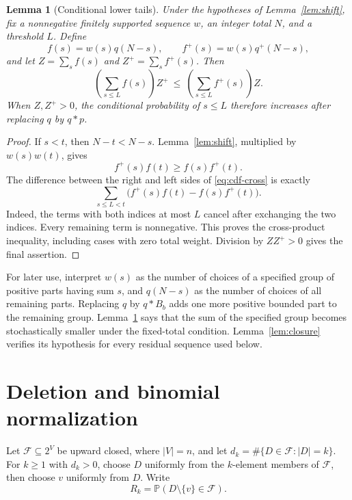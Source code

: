 \documentclass[11pt]{article}
\newtheorem{lemma}[theorem]{Lemma}
\theoremstyle{definition}
\theoremstyle{remark}
\newcommand{\Prob}{\mathbb{P}}
\begin{document}
\begin{lemma}[Conditional lower tails]\label{lem:conditional}
Under the hypotheses of Lemma~\ref{lem:shift}, fix a nonnegative finitely
supported sequence $w$, an integer total $N$, and a threshold $L$.
Define
\[
 f(s)=w(s)q(N-s),\qquad f^+(s)=w(s)q^+(N-s),
\]
and let $Z=\sum_s f(s)$ and $Z^+=\sum_s f^+(s)$. Then
\begin{equation}\label{eq:cdf-cross}
 \left(\sum_{s\leq L}f(s)\right)Z^+
 \ \leq\ \left(\sum_{s\leq L}f^+(s)\right)Z.
\end{equation}
When $Z,Z^+>0$, the conditional probability of $s\leq L$ therefore
increases after replacing $q$ by $q*p$.
\end{lemma}

\begin{proof}
If $s<t$, then $N-t<N-s$. Lemma~\ref{lem:shift}, multiplied by
$w(s)w(t)$, gives
\[
 f^+(s)f(t)\geq f(s)f^+(t).
\]
The difference between the right and left sides of \eqref{eq:cdf-cross}
is exactly
\begin{equation}\label{eq:cross-difference}
 \sum_{s\leq L<t}\bigl(f^+(s)f(t)-f(s)f^+(t)\bigr).
\end{equation}
Indeed, the terms with both indices at most $L$ cancel after exchanging
the two indices. Every remaining term is nonnegative. This proves the
cross-product inequality, including cases with zero total weight.
Division by $ZZ^+>0$ gives the final assertion.
\end{proof}

For later use, interpret $w(s)$ as the number of choices of a specified
group of positive parts having sum $s$, and $q(N-s)$ as the number of
choices of all remaining parts. Replacing $q$ by $q*B_b$ adds one more
positive bounded part to the remaining group. Lemma~\ref{lem:conditional}
says that the sum of the specified group becomes stochastically smaller
under the fixed-total condition. Lemma~\ref{lem:closure} verifies its
hypothesis for every residual sequence used below.

\section{Deletion and binomial normalization}\label{sec:deletion}

Let $\mathcal F\subseteq2^V$ be upward closed, where $|V|=n$, and let
$d_k=\#\{D\in\mathcal F:|D|=k\}$. For $k\geq1$ with $d_k>0$, choose
$D$ uniformly from the $k$-element members of $\mathcal F$, then choose
$v$ uniformly from $D$. Write
\[
 R_k=\Prob(D\setminus\{v\}\in\mathcal F).
\]
\end{document}
